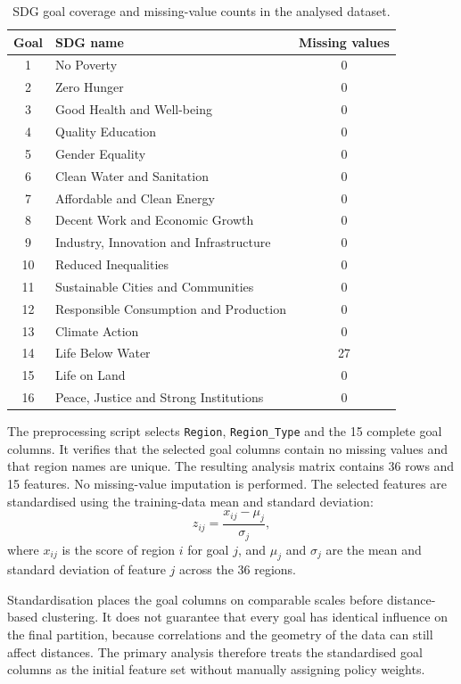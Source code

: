 \documentclass[11pt,a4paper]{article}
\begin{document}
\begin{table}[H]
\centering
\caption{SDG goal coverage and missing-value counts in the analysed dataset.}
\label{tab:missing}
\small
\begin{tabular}{clc}
\toprule
Goal & SDG name & Missing values\\
\midrule
1 & No Poverty & 0\\
2 & Zero Hunger & 0\\
3 & Good Health and Well-being & 0\\
4 & Quality Education & 0\\
5 & Gender Equality & 0\\
6 & Clean Water and Sanitation & 0\\
7 & Affordable and Clean Energy & 0\\
8 & Decent Work and Economic Growth & 0\\
9 & Industry, Innovation and Infrastructure & 0\\
10 & Reduced Inequalities & 0\\
11 & Sustainable Cities and Communities & 0\\
12 & Responsible Consumption and Production & 0\\
13 & Climate Action & 0\\
14 & Life Below Water & 27\\
15 & Life on Land & 0\\
16 & Peace, Justice and Strong Institutions & 0\\
\bottomrule
\end{tabular}
\end{table}

The preprocessing script selects \texttt{Region}, \texttt{Region\_Type} and the 15 complete goal columns. It verifies that the selected goal columns contain no missing values and that region names are unique. The resulting analysis matrix contains 36 rows and 15 features. No missing-value imputation is performed. The selected features are standardised using the training-data mean and standard deviation:
\begin{equation}
z_{ij}=\frac{x_{ij}-\mu_j}{\sigma_j},
\label{eq:standard}
\end{equation}
where $x_{ij}$ is the score of region $i$ for goal $j$, and $\mu_j$ and $\sigma_j$ are the mean and standard deviation of feature $j$ across the 36 regions.

Standardisation places the goal columns on comparable scales before distance-based clustering. It does not guarantee that every goal has identical influence on the final partition, because correlations and the geometry of the data can still affect distances. The primary analysis therefore treats the standardised goal columns as the initial feature set without manually assigning policy weights.
\end{document}
